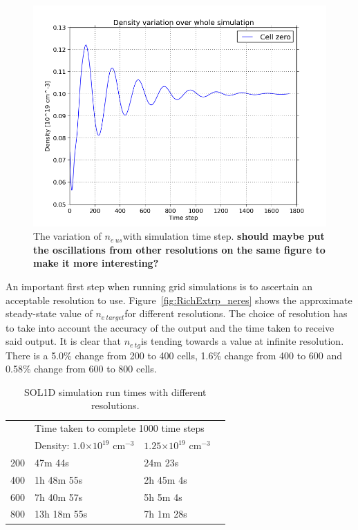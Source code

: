 \documentclass[11pt, twocolumn]{article}  %
\providecommand{\e}[1]{\ensuremath{\times 10^{#1}}} %
\providecommand{\neus}{$n_{e~us}$} %
\providecommand{\netarget}{$n_{e~target}$} %
\providecommand{\netg}{$n_{e~tg}$} %
\begin{document}
\begin{figure}
\includegraphics[scale=0.4]{Figures/sol1d/ne_var_ny=800.PNG}
\centering
\caption{The variation of \neus with simulation time step. \textbf{should maybe put the oscillations from other resolutions on the same figure to make it more interesting?}}\label{fig:ne_var_ny=800}
\end{figure}

An important first step when running grid simulations is to ascertain an acceptable resolution to use. Figure~\ref{fig:RichExtrp_neres} shows the approximate steady-state value of \netarget for different resolutions. The choice of resolution has to take into account the accuracy of the output and the time taken to receive said output. It is clear that \netg is tending towards a value at infinite resolution. There is a 5.0\% change from 200 to 400 cells, 1.6\% change from 400 to 600 and 0.58\% change from 600 to 800 cells.

\begin{table}[]
\caption{SOL1D simulation run times with different resolutions.}
\label{tab:sol1dres}
\begin{tabular}{llll}
\multicolumn{1}{l|}{\multirow{2}{*}{}} & \multicolumn{3}{l}{Time taken to complete 1000 time steps}    \\ \cline{2-4} 
 \multicolumn{1}{l|}{Resolution}        & \multicolumn{1}{l|}{Density: $1.0\e{19}$ cm$^{-3}$} & \multicolumn{1}{l|}{$1.25\e{19}$ cm$^{-3}$}  &  \\ \hline
                   200                 &      47m 44s          &    24m 23s         &  \\
                   400                 &      1h 48m 55s       &    2h 45m 4s       &  \\
                   600                 &      7h 40m 57s       &    5h 5m 4s        &  \\
                   800                 &      13h 18m 55s      &    7h 1m 28s       &  
\end{tabular}
\end{table}
\end{document}
